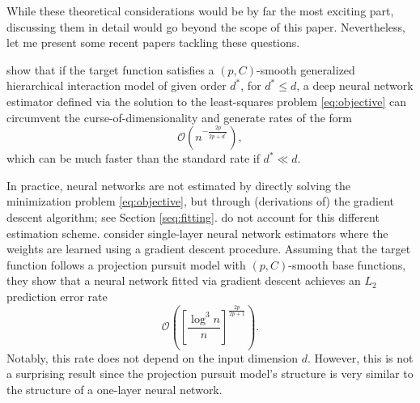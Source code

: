 While these theoretical considerations would be by far the most exciting part,
discussing them in detail would go beyond the scope of this paper. Nevertheless, let me
present some recent papers tackling these questions.

\cite{Bauer.2019} show that if the target function satisfies a $(p, C)$-smooth
generalized hierarchical interaction model of given order $d^\ast$, for $d^\ast \leq d$,
a deep neural network estimator defined via the solution to the least-squares problem
\ref{eq:objective} can circumvent the curse-of-dimensionality and generate rates of the
form
\[
\mathcal{O}\left(n^{-\frac{2p}{2p + d^\ast}}\right),
\]
which can be much faster than the standard rate if $d^\ast \ll d$.

In practice, neural networks are not estimated by directly solving the minimization
problem \ref{eq:objective}, but through (derivations of) the gradient descent
algorithm; see Section \ref{seq:fitting}. \cite{Bauer.2019} do not account for this
different estimation scheme. \cite{Braun.2019} consider single-layer neural network
estimators where the weights are learned using a gradient descent procedure. Assuming
that the target function follows a projection pursuit model with $(p, C)$-smooth base
functions, they show that a neural network fitted via gradient descent achieves an
$L_2$ prediction error rate
\[
\mathcal{O}\left(\left[\frac{\log^3 n}{n} \right]^{\frac{2p}{2p + 1}}\right).
\]
Notably, this rate does not depend on the input dimension $d$. However, this is not a
surprising result since the projection pursuit model's structure is very similar to the
structure of a one-layer neural network.
